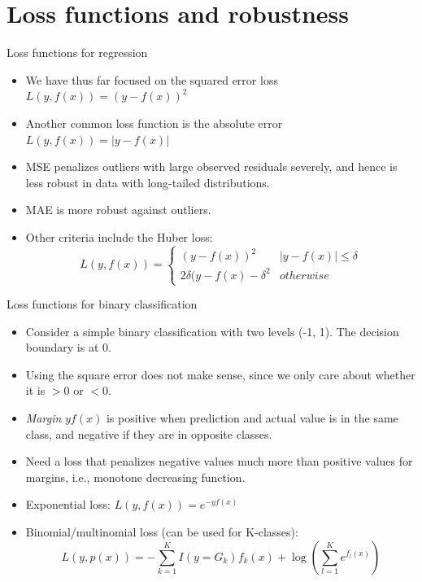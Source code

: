 \documentclass{beamer}
\begin{document}
\section{Loss functions and robustness}


\begin{frame}{Loss functions for regression}
    \begin{itemize}
        \item We have thus far focused on the squared error loss $L(y, f(x)) = (y - f(x))^2$
        \item Another common loss function is the absolute error $L(y, f(x)) = |y - f(x)|$
        \item MSE penalizes outliers with large observed residuals severely, and hence is less robust in data with long-tailed distributions.
        \item MAE is more robust against outliers.
        \item Other criteria include the Huber loss:
        \begin{equation*}
            L(y, f(x)) = \left\{ \begin{array}{cc}
                (y - f(x))^2 & |y-f(x)| \leq \delta \\
                2\delta (y-f(x) - \delta^2 & otherwise 
            \end{array}\right.
        \end{equation*}
    \end{itemize}
\end{frame}


\begin{frame}{Loss functions for binary classification}
    \begin{itemize}
        \item Consider a simple binary classification with two levels (-1, 1). The decision boundary is at 0.
        \item Using the square error does not make sense, since we only care about whether it is $>0$ or $<0$.
        \item \textit{Margin} $yf(x)$ is positive when prediction and actual value is in the same class, and negative if they are in opposite classes.
        \item Need a loss that penalizes negative values much more than positive values for margins, i.e., monotone decreasing function.
        \item Exponential loss: $L(y, f(x)) = e^{-yf(x)}$
        \item Binomial/multinomial loss (can be used for K-classes):
        \begin{equation*}
            L(y, p(x)) = -\sum_{k=1}^K I(y=G_k)f_k(x) + \log \left(\sum_{l=1}^K e^{f_l(x)}\right)
        \end{equation*}
    \end{itemize}
\end{frame}
\end{document}
